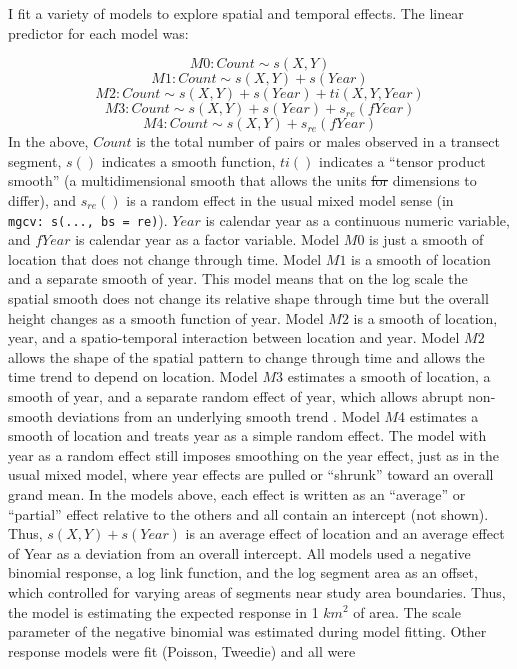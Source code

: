 \documentclass[
  10pt,
  letterpaper,
]{article}
\makeatletter
\providecommand{\DIFaddtex}[1]{{\protect\color{blue}\uwave{#1}}} %
\providecommand{\DIFdeltex}[1]{{\protect\color{red}\sout{#1}}} %
\providecommand{\DIFaddbegin}{} %
\providecommand{\DIFaddend}{} %
\providecommand{\DIFdelbegin}{} %
\providecommand{\DIFdelend}{} %
\providecommand{\DIFadd}[1]{\texorpdfstring{\DIFaddtex{#1}}{#1}} %
\providecommand{\DIFdel}[1]{\texorpdfstring{\DIFdeltex{#1}}{}} %
\providecommand{\DIFscaledelfig}{0.5}
\newlength{\DIFdelgraphicswidth} %
\newlength{\DIFdelgraphicsheight} %
\providecommand{\DIFaddincludegraphics}[2][]{{\color{blue}\fbox{\DIFOincludegraphics[#1]{#2}}}} %
\providecommand{\DIFdelincludegraphics}[2][]{%
\sbox{\DIFdelgraphicsbox}{\DIFOincludegraphics[#1]{#2}}%
\settoboxwidth{\DIFdelgraphicswidth}{\DIFdelgraphicsbox} %
\settoboxtotalheight{\DIFdelgraphicsheight}{\DIFdelgraphicsbox} %
\scalebox{\DIFscaledelfig}{%
\parbox[b]{\DIFdelgraphicswidth}{\usebox{\DIFdelgraphicsbox}\\[-\baselineskip] \rule{\DIFdelgraphicswidth}{0em}}\llap{\resizebox{\DIFdelgraphicswidth}{\DIFdelgraphicsheight}{%
\setlength{\unitlength}{\DIFdelgraphicswidth}%
\begin{picture}(1,1)%
\thicklines\linethickness{2pt} %
{\color[rgb]{1,0,0}\put(0,0){\framebox(1,1){}}}%
{\color[rgb]{1,0,0}\put(0,0){\line( 1,1){1}}}%
{\color[rgb]{1,0,0}\put(0,1){\line(1,-1){1}}}%
\end{picture}%
}\hspace*{3pt}}} %
} %
\DeclareRobustCommand{\DIFaddbegin}{\DIFOaddbegin \let\includegraphics\DIFaddincludegraphics} %
\DeclareRobustCommand{\DIFaddend}{\DIFOaddend \let\includegraphics\DIFOincludegraphics} %
\DeclareRobustCommand{\DIFdelbegin}{\DIFOdelbegin \let\includegraphics\DIFdelincludegraphics} %
\DeclareRobustCommand{\DIFdelend}{\DIFOaddend \let\includegraphics\DIFOincludegraphics} %
\let\sout@orig\sout %
\renewcommand{\sout}[1]{\ifmmode\text{\sout@orig{\ensuremath{#1}}}\else\sout@orig{#1}\fi} %
\makeatother
\begin{document}
I fit a variety of models to explore spatial and temporal effects. The
linear predictor for each model was:

\[M0: Count \sim s(X, Y)\] \[M1: Count \sim s(X, Y) + s(Year)\]
\[M2: Count \sim s(X, Y) + s(Year) + ti(X, Y, Year)\]
\[M3: Count \sim s(X, Y) + s(Year) + s_{re}(fYear)\]
\[M4: Count \sim s(X, Y) + s_{re}(fYear)\] In the above, \(Count\) is
the total number of pairs or males observed in a transect segment,
\(s()\) indicates a smooth function, \(ti()\) indicates a ``tensor
product smooth'' (a multidimensional smooth that allows the units \DIFdelbegin \DIFdel{for
}\DIFdelend \DIFaddbegin \DIFadd{of the }\DIFaddend dimensions to differ), and \(s_{re}()\) is a random effect in the usual
mixed model sense (in
\texttt{mgcv:\ s(...,\ bs\ =\ \textquotesingle{}re\textquotesingle{})}).
\(Year\) is calendar year as a continuous numeric variable, and
\(fYear\) is calendar year as a factor variable. Model \(M0\) is just a
smooth of location that does not change through time. Model \(M1\) is a
smooth of location and a separate smooth of year. This model means that
on the log scale the spatial smooth does not change its relative shape
through time but the overall height changes as a smooth function of
year. Model \(M2\) is a smooth of location, year, and a spatio-temporal
interaction between location and year. Model \(M2\) allows the shape of
the spatial pattern to change through time and allows the time trend to
depend on location. Model \(M3\) estimates a smooth of location, a
smooth of year, and a separate random effect of year, which allows
abrupt non-smooth deviations from an underlying smooth trend
\citep{smith2021north}. Model \(M4\) estimates a smooth of location and
treats year as a simple random effect. The model with year as a random
effect still imposes smoothing on the year effect, just as in the usual
mixed model, where year effects are pulled or ``shrunk'' toward an
overall grand mean. In the models above, each effect is written as an
``average'' or ``partial'' effect relative to the others and all contain
an intercept (not shown). Thus, \(s(X,Y) + s(Year)\) is an average
effect of location and an average effect of Year as a deviation from an
overall intercept. All models used a negative binomial response, a log
link function, and the log segment area as an offset, which controlled
for varying areas of segments near study area boundaries. Thus, the
model is estimating the expected response in 1 \(km^2\) of area. The
scale parameter of the negative binomial was estimated during model
fitting. Other response models were fit (Poisson, Tweedie) and all were
\end{document}
